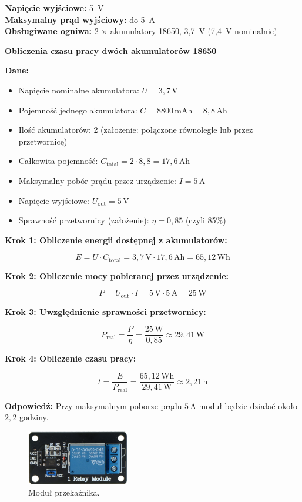 \documentclass[magisterska]{pracadypl}
\begin{document}
\textbf{Napięcie wyjściowe:} 5~V \\
\textbf{Maksymalny prąd wyjściowy:} do 5~A \\
\textbf{Obsługiwane ogniwa:} 2 × akumulatory 18650, 3{,}7~V (7{,}4~V nominalnie)

\textbf{Obliczenia czasu pracy dwóch akumulatorów 18650}

\textbf{Dane:}
\begin{itemize}
  \item Napięcie nominalne akumulatora: $U = 3{,}7\,\mathrm{V}$
  \item Pojemność jednego akumulatora: $C = 8800\,\mathrm{mAh} = 8{,}8\,\mathrm{Ah}$
  \item Ilość akumulatorów: 2 (założenie: połączone równolegle lub przez przetwornicę)
  \item Całkowita pojemność: $C_{\text{total}} = 2 \cdot 8{,}8 = 17{,}6\,\mathrm{Ah}$
  \item Maksymalny pobór prądu przez urządzenie: $I = 5\,\mathrm{A}$
  \item Napięcie wyjściowe: $U_{\text{out}} = 5\,\mathrm{V}$
  \item Sprawność przetwornicy (założenie): $\eta = 0{,}85$ (czyli 85\%)
\end{itemize}

\textbf{Krok 1: Obliczenie energii dostępnej z akumulatorów:}

\[
E = U \cdot C_{\text{total}} = 3{,}7\,\mathrm{V} \cdot 17{,}6\,\mathrm{Ah} = 65{,}12\,\mathrm{Wh}
\]

\textbf{Krok 2: Obliczenie mocy pobieranej przez urządzenie:}

\[
P = U_{\text{out}} \cdot I = 5\,\mathrm{V} \cdot 5\,\mathrm{A} = 25\,\mathrm{W}
\]

\textbf{Krok 3: Uwzględnienie sprawności przetwornicy:}

\[
P_{\text{real}} = \frac{P}{\eta} = \frac{25\,\mathrm{W}}{0{,}85} \approx 29{,}41\,\mathrm{W}
\]

\textbf{Krok 4: Obliczenie czasu pracy:}

\[
t = \frac{E}{P_{\text{real}}} = \frac{65{,}12\,\mathrm{Wh}}{29{,}41\,\mathrm{W}} \approx 2{,}21\,\mathrm{h}
\]

\textbf{Odpowiedź:} Przy maksymalnym poborze prądu $5\,\mathrm{A}$ moduł będzie działać około $2{,}2$ godziny.

\begin{figure}[H]  %
    \centering  %
    \includegraphics[width=0.4\textwidth]{images/relay.png}  %
    \captionsetup{font=footnotesize}
    \caption[Moduł przekaźnika. https://l1nq.com/hQOm9]{Moduł przekaźnika.}
\end{figure}
\end{document}

